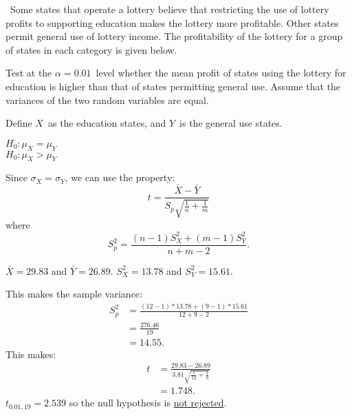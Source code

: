 \begin{problem}
  ~Some states that operate a lottery believe that restricting the use of lottery profits to supporting education makes the lottery more profitable. Other states permit general use of lottery income.  The profitability of the lottery for a group of states in each category is given below.

  Test at the ${\alpha = 0.01}$~level whether the mean profit of states using the lottery for education is higher than that of states permitting general use. Assume that the variances of the two random variables are equal.
\end{problem}

Define $X$~as the education states, and $Y$~is the general use states.

\noindent
${H_0: \mu_{X} = \mu_{Y}}$ \\
${H_0: \mu_{X} > \mu_{Y}}$

\noindent
Since ${\sigma_{X} = \sigma_{Y}}$, we can use the property:
\begin{equation}
  t = \frac{\bar{X} - \bar{Y}}{S_{p} \sqrt{\frac{1}{n} + \frac{1}{m}}}
\end{equation}
\noindent
where
\begin{equation}
  S^{2}_{p} = \frac{(n-1)S^{2}_{X} + (m-1)S^{2}_{Y}}{n + m - 2}\text{.}
\end{equation}

${\bar{X} = 29.83}$ and ${\bar{Y} = 26.89}$. ${S^{2}_{X} = 13.78}$ and ${S^{2}_{Y} = 15.61}$.

\noindent
This makes the sample variance:
\begin{align}
  S^{2}_{p} &= \frac{(12 - 1) * 13.78 + (9 - 1) * 15.61}{12 + 9 - 2} \\
            &= \frac{276.46}{19} \\
            &= 14.55 \text{.}
\end{align}
This makes:
\begin{align}
  t &=  \frac{29.83 - 26.89}{3.81 \sqrt{\frac{1}{12} + \frac{1}{9}}} \\
    &= 1.748\text{.}
\end{align}
\noindent
${t_{0.01,19} = 2.539}$ so the null hypothesis is \underline{not rejected}.
